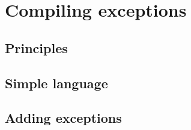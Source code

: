 \chapter{Compiling exceptions}

\section{Principles}

\section{Simple language}

\section{Adding exceptions}
